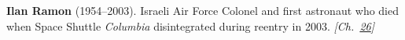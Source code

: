 \textbf{Ilan Ramon} (1954–2003). Israeli Air Force Colonel and first astronaut who died when Space Shuttle \emph{Columbia} disintegrated during reentry in 2003. \emph{[Ch.~\hyperref[ch:jewishcalendar]{26}]}

